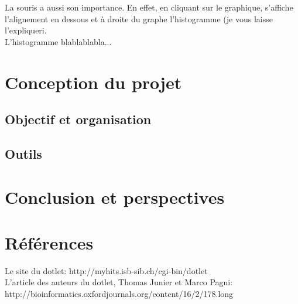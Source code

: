 \documentclass{report}
\begin{document}
La souris a aussi son importance. En effet, en cliquant sur le graphique, s'affiche l'alignement en dessous et à droite du graphe l'histogramme (je vous laisse l'expliquer^^).\\
L'histogramme blablablabla...


\chapter{Conception du projet}

\section{Objectif et organisation}

\section{Outils}



\chapter*{Conclusion et perspectives}


\chapter*{Références}
Le site du dotlet: http://myhits.isb-sib.ch/cgi-bin/dotlet\\
L'article des auteurs du dotlet, Thomas Junier et Marco Pagni: http://bioinformatics.oxfordjournals.org/content/16/2/178.long\\
\end{document}
